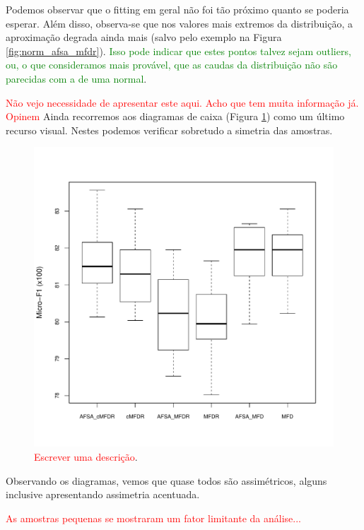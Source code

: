 \documentclass[conference]{IEEEtran}
\begin{document}
Podemos observar que o fitting em geral não foi tão próximo quanto se poderia esperar.
Além disso, observa-se que nos valores mais extremos da distribuição, a aproximação degrada ainda mais (salvo pelo exemplo na Figura \ref{fig:norm_afsa_mfdr}).
\textcolor{green}{Isso pode indicar que estes pontos talvez sejam outliers, ou, o que consideramos mais provável, que as caudas da distribuição não são parecidas com a de uma normal}.

\textcolor{red}{Não vejo necessidade de apresentar este aqui. Acho que tem muita informação já. Opinem}
Ainda recorremos aos diagramas de caixa (Figura \ref{fig:boxplot}) como um último recurso visual. 
Nestes podemos verificar sobretudo a simetria das amostras.

\begin{figure}[h]
	\centering
	\includegraphics[width=\linewidth]{img/blueboxplot.pdf}
	\caption{\textcolor{red}{Escrever uma descrição}.}
	\label{fig:boxplot}
\end{figure}

Observando os diagramas, vemos que quase todos são assimétricos, alguns inclusive apresentando assimetria acentuada.

\textcolor{red}{As amostras pequenas se mostraram um fator limitante da análise...}
\end{document}
